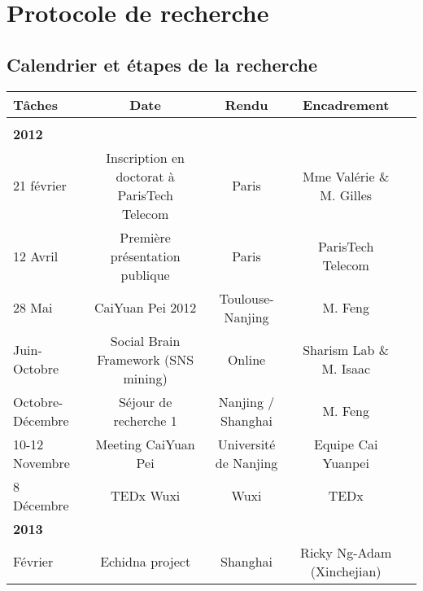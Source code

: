 \chapter{Protocole de recherche}

\section{Calendrier et étapes de la recherche}

{\small
\begin{table}[h!]
\begin{tabulary}{\linewidth}{ l C C C C}

    \textbf{Tâches} &  
    \textbf{Date} & 
    \textbf{Rendu} &
    \textbf{Encadrement} \\
    
    \hline \\[-1.2ex]

    \textbf{2012}  & & & \\

    21 février & 
    Inscription en doctorat à ParisTech Telecom &
    Paris & 
    Mme Valérie  \& M. Gilles  \\

    12 Avril & 
    Première présentation publique &
    Paris & 
    ParisTech Telecom \\

    28 Mai & 
    CaiYuan Pei 2012&
    Toulouse-Nanjing & 
    M.  Feng \\
    
    Juin-Octobre& 
    Social Brain Framework (SNS mining)&
    Online & 
    Sharism Lab \& M. Isaac  \\

    Octobre-Décembre & 
    Séjour de recherche 1 &
    Nanjing / Shanghai & 
    M.  Feng \\

    10-12 Novembre & 
    Meeting CaiYuan Pei &
    Université de Nanjing & 
    Equipe Cai Yuanpei \\

    8 Décembre & 
    TEDx Wuxi &
    Wuxi & 
    TEDx \\

    \textbf{2013}  & & & \\

    Février & 
    Echidna project  &
    Shanghai & 
    Ricky Ng-Adam (Xinchejian) \\


\end{tabulary}
\end{table}}
